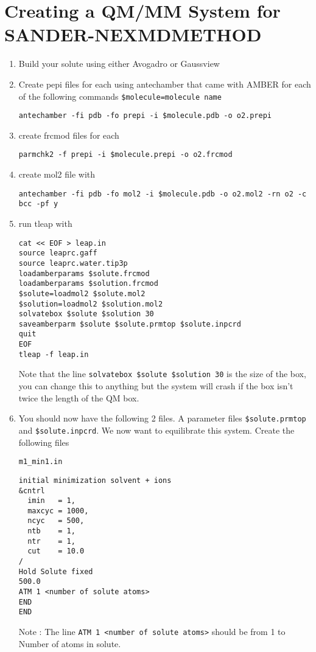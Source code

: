 \documentclass[11pt]{article}
\begin{document}
\section{Creating a QM/MM System for SANDER-NEXMD\hfill{}\textsc{METHOD}}
\label{sec:orge750ba6}
\begin{enumerate}
\item Build your solute using either Avogadro or Gaussview
\item Create pepi files for each using antechamber that came with AMBER for each of
the following commands \texttt{\$molecule=molecule name} 
\begin{verbatim}
antechamber -fi pdb -fo prepi -i $molecule.pdb -o o2.prepi
\end{verbatim}
\item create frcmod files for each
\begin{verbatim}
parmchk2 -f prepi -i $molecule.prepi -o o2.frcmod
\end{verbatim}
\item create mol2 file with
\begin{verbatim}
antechamber -fi pdb -fo mol2 -i $molecule.pdb -o o2.mol2 -rn o2 -c bcc -pf y
\end{verbatim}
\item run tleap with
\begin{verbatim}
cat << EOF > leap.in
source leaprc.gaff
source leaprc.water.tip3p
loadamberparams $solute.frcmod
loadamberparams $solution.frcmod
$solute=loadmol2 $solute.mol2
$solution=loadmol2 $solution.mol2
solvatebox $solute $solution 30
saveamberparm $solute $solute.prmtop $solute.inpcrd
quit
EOF
tleap -f leap.in
\end{verbatim}
Note that the line \texttt{solvatebox \$solute \$solution 30} is the size of the
 box, you can change this to anything but the system will crash if the box
 isn't twice the length of the QM box.
\item You should now have the following 2 files. A parameter files \texttt{\$solute.prmtop}
and \texttt{\$solute.inpcrd}. We now want to equilibrate this system. Create the
following files
\begin{verbatim}
m1_min1.in
\end{verbatim}

\begin{verbatim}
initial minimization solvent + ions
&cntrl
  imin   = 1,
  maxcyc = 1000,
  ncyc   = 500,
  ntb    = 1,
  ntr    = 1,
  cut    = 10.0
/
Hold Solute fixed
500.0
ATM 1 <number of solute atoms>
END
END
\end{verbatim}
Note : The line \texttt{ATM 1 <number of solute atoms>} should be from 1 to Number of atoms in solute.


\end{enumerate}
\end{document}
